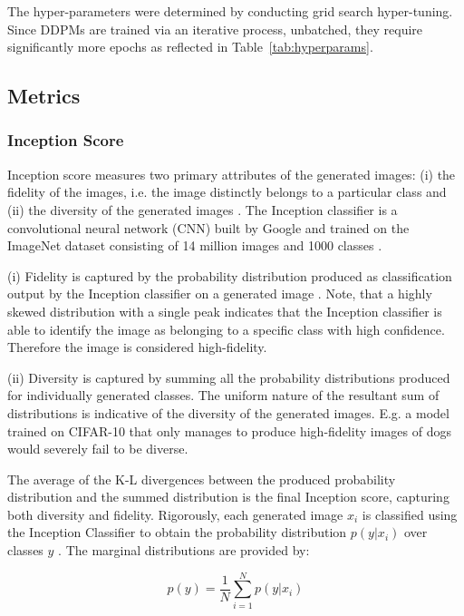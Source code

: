 \documentclass[%
 reprint,
 amsmath,amssymb,
 aps,
]{revtex4-2}
\begin{document}
The hyper-parameters were determined by conducting grid search hyper-tuning. Since DDPMs are trained via an iterative process, unbatched, they require significantly more epochs as reflected in Table~\ref{tab:hyperparams}.


\subsection{Metrics}
\label{metrics_}
\subsubsection{Inception Score}
Inception score measures two primary attributes of the generated images: (i) the fidelity of the images, i.e. the image distinctly belongs to a particular class and (ii) the diversity of the generated images \cite{mack_2019}. The Inception classifier is a convolutional neural network (CNN) built by Google and trained on the ImageNet dataset consisting of 14 million images and 1000 classes \cite{inception_model}.


(i) Fidelity is captured by the probability distribution produced as classification output by the Inception classifier on a generated image \cite{mack_2019}. Note, that a highly skewed distribution with a single peak indicates that the Inception classifier is able to identify the image as belonging to a specific class with high confidence. Therefore the image is considered high-fidelity.



(ii) Diversity is captured by summing all the probability distributions produced for individually generated classes. The uniform nature of the resultant sum of distributions is indicative of the diversity of the generated images. E.g. a model trained on CIFAR-10 that only manages to produce high-fidelity images of dogs would severely fail to be diverse.



The average of the K-L divergences between the produced probability distribution and the summed distribution is the final Inception score, capturing both diversity and fidelity.
Rigorously, each generated image $x_i$ is classified using the Inception Classifier to obtain the probability distribution $p(y|x_i)$ over classes $y$ \cite{isscore}. The marginal distributions are provided by: 

\begin{equation}
p(y) = \frac{1}{N} \sum_{i=1}^{N} p(y|x_i)
\end{equation}
\end{document}
